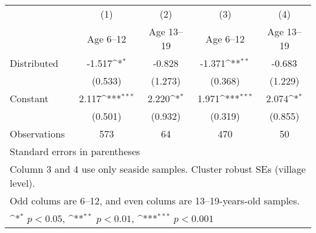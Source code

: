 {
\def\sym#1{\ifmmode^{#1}\else\(^{#1}\)\fi}
\begin{tabular}{l*{4}{c}}
\hline\hline
                    &\multicolumn{1}{c}{(1)}&\multicolumn{1}{c}{(2)}&\multicolumn{1}{c}{(3)}&\multicolumn{1}{c}{(4)}\\
                    &\multicolumn{1}{c}{Age 6--12}&\multicolumn{1}{c}{Age 13--19}&\multicolumn{1}{c}{Age 6--12}&\multicolumn{1}{c}{Age 13--19}\\
\hline
Distributed         &      -1.517\sym{*}  &      -0.828         &      -1.371\sym{**} &      -0.683         \\
                    &     (0.533)         &     (1.273)         &     (0.368)         &     (1.229)         \\
[1em]
Constant            &       2.117\sym{***}&       2.220\sym{*}  &       1.971\sym{***}&       2.074\sym{*}  \\
                    &     (0.501)         &     (0.932)         &     (0.319)         &     (0.855)         \\
\hline
Observations        &         573         &          64         &         470         &          50         \\
\hline\hline
\multicolumn{5}{l}{\footnotesize Standard errors in parentheses}\\
\multicolumn{5}{l}{\footnotesize Column 3 and 4 use only seaside samples. Cluster robust SEs (village level).}\\
\multicolumn{5}{l}{\footnotesize Odd colums are 6--12, and even colums are 13--19-years-old samples.}\\
\multicolumn{5}{l}{\footnotesize \sym{*} \(p<0.05\), \sym{**} \(p<0.01\), \sym{***} \(p<0.001\)}\\
\end{tabular}
}
